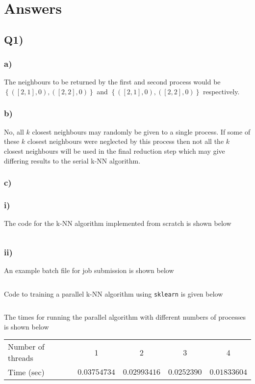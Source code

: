 \section{Answers}

\subsection*{{\bf Q1)}}
\subsubsection*{{\bf a)}}
The neighbours to be returned by the first and second process would be $\left\{ \left( \left[ 2,1 \right], 0 \right), \left( \left[ 2,2 \right], 0 \right) \right\}$ and $\left\{ \left( \left[ 2,1 \right], 0 \right), \left( \left[ 2,2 \right], 0 \right) \right\}$ respectively.

\subsubsection{{\bf b)}}
No, all $k$ closest neighbours may randomly be given to a single process. If some of these $k$ closest neighbours  were neglected by this process then not all the $k$ closest neighbours will be used in the final reduction step which may give differing results to the serial k-NN algorithm.

\subsubsection{{\bf c)}}
\subsubsection{{\bf i)}}
The code for the k-NN algorithm implemented from scratch is shown below
\inputminted[mathescape,
    linenos,
    numbersep=5pt,
    frame=lines,
    framesep=2mm]{python}{src/KNN_parallel.py}

\subsubsection{{\bf ii)}}
An example batch file for job submission is shown below
\inputminted[mathescape,
    linenos,
    numbersep=5pt,
    frame=lines,
    framesep=2mm]{bash}{src/batch/KNN_1_thread.py}
    
Code to training a parallel k-NN algorithm using \texttt{sklearn} is given below
\inputminted[mathescape,
    linenos,
    numbersep=5pt,
    frame=lines,
    framesep=2mm]{python}{src/KNN_demo.py}
    
The times for running the parallel algorithm with different numbers of processes is shown below
\begin{table}[]
\begin{tabular}{l|cccc}
Number of threads & 1 & 2 & 3 & 4 \\ \cline{2-5} 
Time (sec)        & $0.03754734$ & $0.02993416$ & $0.0252390$ & $0.01833604$
\end{tabular}
\end{table}